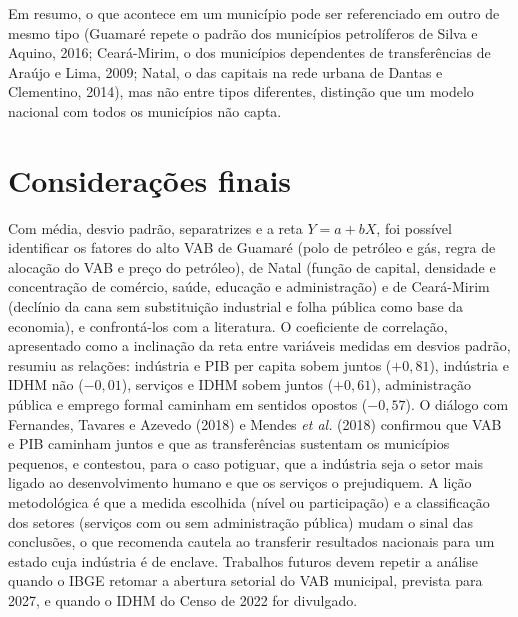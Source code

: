 \documentclass[12pt,a4paper]{article}
\begin{document}
Em resumo, o que acontece em um município pode ser referenciado em outro de mesmo tipo (Guamaré repete o padrão dos municípios petrolíferos de Silva e Aquino, 2016; Ceará-Mirim, o dos municípios dependentes de transferências de Araújo e Lima, 2009; Natal, o das capitais na rede urbana de Dantas e Clementino, 2014), mas não entre tipos diferentes, distinção que um modelo nacional com todos os municípios não capta.

\section{Considerações finais}

Com média, desvio padrão, separatrizes e a reta $Y = a + bX$, foi possível identificar os fatores do alto VAB de Guamaré (polo de petróleo e gás, regra de alocação do VAB e preço do petróleo), de Natal (função de capital, densidade e concentração de comércio, saúde, educação e administração) e de Ceará-Mirim (declínio da cana sem substituição industrial e folha pública como base da economia), e confrontá-los com a literatura. O coeficiente de correlação, apresentado como a inclinação da reta entre variáveis medidas em desvios padrão, resumiu as relações: indústria e PIB per capita sobem juntos ($+0{,}81$), indústria e IDHM não ($-0{,}01$), serviços e IDHM sobem juntos ($+0{,}61$), administração pública e emprego formal caminham em sentidos opostos ($-0{,}57$). O diálogo com Fernandes, Tavares e Azevedo (2018) e Mendes \textit{et al.} (2018) confirmou que VAB e PIB caminham juntos e que as transferências sustentam os municípios pequenos, e contestou, para o caso potiguar, que a indústria seja o setor mais ligado ao desenvolvimento humano e que os serviços o prejudiquem. A lição metodológica é que a medida escolhida (nível ou participação) e a classificação dos setores (serviços com ou sem administração pública) mudam o sinal das conclusões, o que recomenda cautela ao transferir resultados nacionais para um estado cuja indústria é de enclave. Trabalhos futuros devem repetir a análise quando o IBGE retomar a abertura setorial do VAB municipal, prevista para 2027, e quando o IDHM do Censo de 2022 for divulgado.
\end{document}
